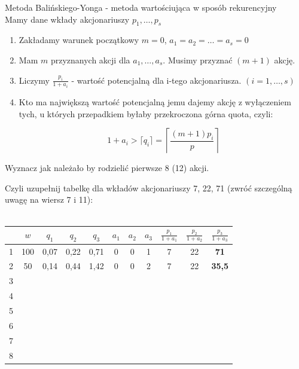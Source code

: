 \documentclass[12pt,a4paper]{article}
\theoremstyle{break}
\begin{document}
	\begin{zad}
		Metoda Balińskiego-Yonga - metoda wartościująca w sposób rekurencyjny\\
		
		Mamy dane wkłady akcjonariuszy $p_1,\dots,p_s$\\
		
		\begin{enumerate}[1.]
			\item Zakładamy warunek początkowy $m=0$, $a_1=a_2=\dots=a_s=0$
			\item Mam $m$ przyznanych akcji dla $a_1,\dots,a_s$. Musimy przyznać $(m+1)$ akcję.
			\item Liczymy $\frac{p_i}{1+a_i}$ - wartość potencjalną dla i-tego akcjonariusza. $(i=1,\dots,s)$
			\item Kto ma największą wartość potencjalną jemu dajemy akcję z wyłączeniem tych, u których przepadkiem byłaby przekroczona górna quota, czyli:
			
			$$~ 1+a_i > \lceil q_i \rceil = \left\lceil \frac{(m+1)p_i}{p}\right\rceil$$ 
		\end{enumerate}
	
	Wyznacz jak należało by rodzielić pierwsze 8 (12) akcji.
	\end{zad}

	Czyli uzupełnij tabelkę dla wkładów akcjonariuszy 7, 22, 71  (zwróć szczególną uwagę na wiersz 7 i 11):\\\\
	
	\begin{center}
		\begin{tabular}{||c||c||c|c|c||c|c|c||c|c|c||}\hline
		&\Large$w$&\Large$q_1$&\Large$q_2$&\Large$q_3$&\Large$a_1$&\Large$a_2$&\Large$a_3$&\Large$\frac{p_1}{1+a_1}$&\Large$\frac{p_2}{1+a_2}$&\Large$\frac{p_3}{1+a_3}$\\\hline
		1&100&0,07&0,22&0,71&0&0&1&7&22&\textbf{71}\\\hline
		2&50&0,14&0,44&1,42&0&0&2&7&22&\textbf{35,5}\\\hline
		3&&&&&&&&&&\\\hline
		4&&&&&&&&&&\\\hline
		5&&&&&&&&&&\\\hline
		6&&&&&&&&&&\\\hline
		7&&&&&&&&&&\\\hline
		8&&&&&&&&&&\\\hline
	\end{tabular}
	\end{center}
\end{document}
